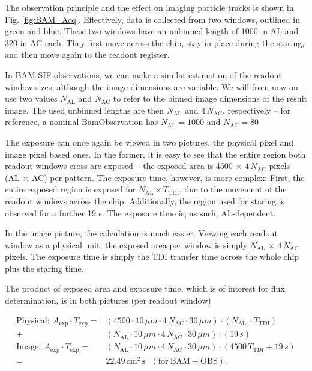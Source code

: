 \documentclass[a4paper, 11pt]{article}
\begin{document}
The observation principle and the effect on imaging particle tracks is shown in Fig. \ref{fig:BAM_Acq}. Effectively, data is collected from two windows, outlined in green and blue. These two windows have an unbinned length of 1000 in AL and 320 in AC each. They first move across the chip, stay in place during the staring, and then move again to the readout register.

In BAM-SIF observations, we can make a similar estimation of the readout window sizes, although the image dimensions are variable. We will from now on use two values $N_\mathrm{AL}$ and $N_\mathrm{AC}$ to refer to the binned image dimensions of the result image. The used unbinned lengths are then $N_\mathrm{AL}$ and $4\, N_\mathrm{AC}$, respectively -- for reference, a nominal BamObservation has $N_\mathrm{AL} = 1000$ and $N_\mathrm{AC} = 80$

The exposure can once again be viewed in two pictures, the physical pixel and image pixel based ones. In the former, it is easy to see that the entire region both readout windows cross are exposed -- the exposed area is 4500 $\times$ $4\, N_\mathrm{AC}$ pixels (AL $\times$ AC) per pattern. The exposure time, however, is more complex: First, the entire exposed region is exposed for $N_\mathrm{AL} \times T_\mathrm{TDI}$, due to the movement of the readout windows across the chip. Additionally, the region used for staring is observed for a further 19 s. The exposure time is, as such, AL-dependent.

In the image picture, the calculation is much easier. Viewing each readout window as a physical unit, the exposed area per window is simply $N_\mathrm{AL}$ $\times$ $4\, N_\mathrm{AC}$ pixels. The exposure time is simply the TDI transfer time across the whole chip plus the staring time.

The product of exposed area and exposure time, which is of interest for flux determination, is in both pictures (per readout window)

\begin{align*}
  \mathrm{Physical: }~ A_\mathrm{exp} \cdot T_\mathrm{exp} = &\left(4500 \cdot 10\,\mu m \cdot 4\, N_\mathrm{AC} \cdot 30\,\mu m \right) \cdot \left( N_\mathrm{AL}\ \cdot T_\mathrm{TDI} \right) \\+ &\left( N_\mathrm{AL} \cdot 10\,\mu m \cdot 4\, N_\mathrm{AC} \cdot 30\,\mu m\right) \cdot \left( 19\,s \right)\\
  \mathrm{Image: }~ A_\mathrm{exp} \cdot T_\mathrm{exp} = &\left( N_\mathrm{AL} \cdot 10\,\mu m \cdot 4\, N_\mathrm{AC} \cdot 30\,\mu m\right) \cdot \left(4500\, T_\mathrm{TDI} + 19\,s \right)\\
  = &22.49\,\mathrm{cm^{2}\,s} ~~~\mathrm{(for~BAM\!\!-\!\!OBS)}.
\end{align*}
\end{document}
